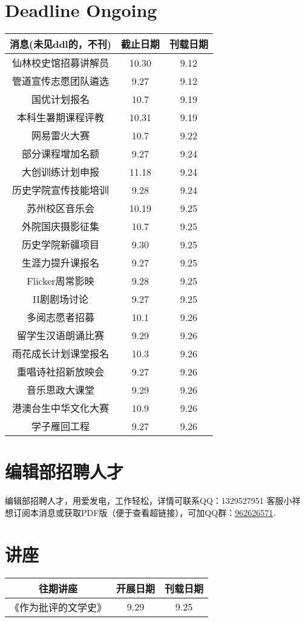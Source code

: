 \documentclass[letterpaper, 12pt]{article}
\begin{document}
\begin{multicols}{2}

\section{Deadline Ongoing}
\begin{tabular}{|c|c|c|}
    \hline
    消息(未见ddl的，不刊) & 截止日期 & 刊载日期\\
    \hline\hline
    仙林校史馆招募讲解员 & 10.30 & 9.12\\
    管道宣传志愿团队遴选 & 9.27 & 9.12\\
    国优计划报名 & 10.7 & 9.19\\
    本科生暑期课程评教 & 10.31 & 9.19\\
    网易雷火大赛 & 10.7 & 9.22\\
    部分课程增加名额 & 9.27 & 9.24\\
    大创训练计划申报 & 11.18 & 9.24\\
    历史学院宣传技能培训 & 9.28 & 9.24\\
    苏州校区音乐会 & 10.19 & 9.25\\
    外院国庆摄影征集 & 10.7 & 9.25\\
    历史学院新疆项目 & 9.30 & 9.25\\
    生涯力提升课报名 & 9.27 & 9.25\\
    Flicker周常影映 & 9.28 & 9.25\\
    II剧剧场讨论 & 9.27 & 9.25\\
    多阅志愿者招募 & 10.1 & 9.26\\
    留学生汉语朗诵比赛 & 9.29 & 9.26\\
    雨花成长计划课堂报名 & 10.3 & 9.26\\
    重唱诗社招新放映会 & 9.27 & 9.26\\
    音乐思政大课堂 & 9.29 & 9.26\\
    港澳台生中华文化大赛 & 10.9 & 9.26\\
    学子雁回工程 & 9.27 & 9.26\\
    \hline
\end{tabular}
\section{编辑部招聘人才}
编辑部招聘人才，用爱发电，工作轻松，详情可联系QQ：1329527951 客服小祥\\想订阅本消息或获取PDF版（便于查看超链接），可加QQ群：\href{https://qm.qq.com/q/FGX1VYCrGS}{962626571}.
\section{讲座}
\begin{tabular}{|c|c|c|}
    \hline
    往期讲座 & 开展日期 & 刊载日期\\
    \hline\hline
   《作为批评的文学史》 & 9.29 & 9.25\\
      \hline
\end{tabular}\\\\

\end{multicols}
\end{document}
